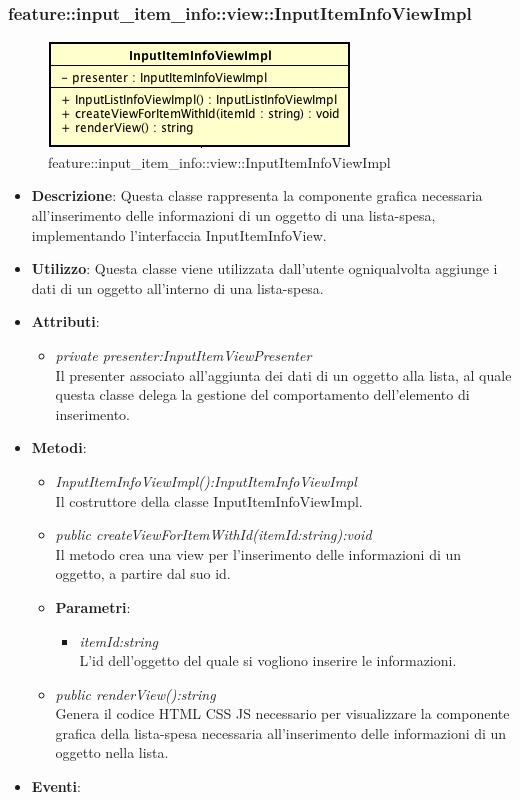 \subsubsection{feature::input\_item\_info::view::InputItemInfoViewImpl}

\label{feature::input_item_info::view::InputItemInfoViewImpl}
\begin{figure}[ht]
	\centering
	\includegraphics[scale=0.5]{Sezioni/SottosezioniST/img/app/InputItemInfoViewImpl.png}
	\caption{feature::input\_item\_info::view::InputItemInfoViewImpl}
\end{figure}

\begin{itemize}
\item \textbf{Descrizione}: Questa classe rappresenta la componente grafica necessaria all'inserimento delle informazioni di un oggetto di una lista-spesa, implementando l'interfaccia InputItemInfoView.
\item \textbf{Utilizzo}: Questa classe viene utilizzata dall'utente ogniqualvolta aggiunge i dati di un oggetto all'interno di una lista-spesa.
\item \textbf{Attributi}:
	\begin{itemize}
	\item \textit{private presenter:InputItemViewPresenter}\\
	Il presenter associato all'aggiunta dei dati di un oggetto alla lista, al quale questa classe delega la gestione del comportamento dell'elemento di inserimento.
	\end{itemize}
\item \textbf{Metodi}:
	\begin{itemize}
	\item \textit{InputItemInfoViewImpl():InputItemInfoViewImpl}\\
	Il costruttore della classe InputItemInfoViewImpl.
	\item \textit{public createViewForItemWithId(itemId:string):void}\\
	Il metodo crea una view per l'inserimento delle informazioni di un oggetto, a partire dal suo id.
			\item{\textbf{Parametri}: \begin{itemize}
			\item \textit{itemId:string}\\
			L'id dell'oggetto del quale si vogliono inserire le informazioni.
			\end{itemize}}
	\item \textit{public renderView():string}\\
	Genera il codice HTML CSS JS necessario per visualizzare la componente grafica della lista-spesa necessaria all'inserimento delle informazioni di un oggetto nella lista.
	\end{itemize}
\item \textbf{Eventi}:
\end{itemize}

